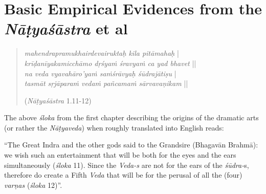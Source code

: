 \section*{Basic Empirical Evidences from the \textsl{Nāṭyaśāstra} et al}
\begin{quote}
\textsl{mahendrapramukhairdevairuktaḥ kila pitāmahaḥ} |\\
\textsl{krīḍanīyakamicchāmo dṛśyaṁ śravyaṁ ca yad bhavet} ||\\
\textsl{na veda vyavahāro’yaṁ saṁśrāvyaḥ śūdrajātiṣu} |\\
\textsl{tasmāt sṛjāparaṁ vedaṁ pañcamaṁ sārvavaṇikam} ||   

\hfill(\textsl{Nāṭyaśāstra} 1.11-12)  
\end{quote}

The above \textsl{śloka} from the first chapter describing the origins of the dramatic arts (or rather the \textsl{Nāṭyaveda}) when roughly translated into English reads: 

“The Great Indra and the other gods said to the Grandsire (Bhagavān Brahmā): we wish such an entertainment that will be both for the eyes and the ears simultaneously (\textsl{śloka} 11). Since the \textsl{Veda-s} are not for the ears of the \textsl{śūdra-}s, therefore do create a Fifth \textsl{Veda} that will be for the perusal of all the (four) \textsl{varṇas} (\textsl{śloka} 12)”. 

